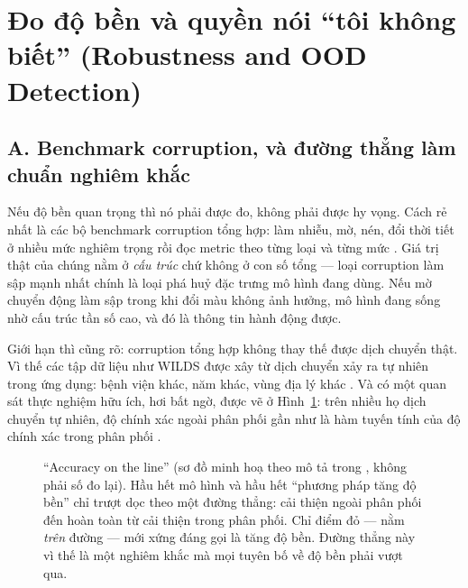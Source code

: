 \documentclass[../../deep_learning.tex]{subfiles}
\begin{document}
\section{Đo độ bền và quyền nói ``tôi không biết'' (Robustness and OOD Detection)}

\subsection{A. Benchmark corruption, và đường thẳng làm chuẩn nghiêm khắc}
Nếu độ bền quan trọng thì nó phải được đo, không phải được hy vọng. Cách rẻ nhất là các bộ benchmark corruption tổng hợp: làm nhiễu, mờ, nén, đổi thời tiết ở nhiều mức nghiêm trọng rồi đọc metric theo từng loại và từng mức \cite{hendrycks2019benchmarking}. Giá trị thật của chúng nằm ở \emph{cấu trúc} chứ không ở con số tổng --- loại corruption làm sập mạnh nhất chính là loại phá huỷ đặc trưng mô hình đang dùng. Nếu mờ chuyển động làm sập trong khi đổi màu không ảnh hưởng, mô hình đang sống nhờ cấu trúc tần số cao, và đó là thông tin hành động được.

Giới hạn thì cũng rõ: corruption tổng hợp không thay thế được dịch chuyển thật. Vì thế các tập dữ liệu như WILDS được xây từ dịch chuyển xảy ra tự nhiên trong ứng dụng: bệnh viện khác, năm khác, vùng địa lý khác \cite{koh2021wilds}. Và có một quan sát thực nghiệm hữu ích, hơi bất ngờ, được vẽ ở Hình~\ref{fig:acc-on-line}: trên nhiều họ dịch chuyển tự nhiên, độ chính xác ngoài phân phối gần như là hàm tuyến tính của độ chính xác trong phân phối \cite{taori2020measuring,recht2019imagenet}.

\begin{figure}[H]\centering
{}
\caption{``Accuracy on the line'' (sơ đồ minh hoạ theo mô tả trong \cite{taori2020measuring}, không phải số đo lại). Hầu hết mô hình và hầu hết ``phương pháp tăng độ bền'' chỉ trượt dọc theo một đường thẳng: cải thiện ngoài phân phối đến hoàn toàn từ cải thiện trong phân phối. Chỉ điểm đỏ --- nằm \emph{trên} đường --- mới xứng đáng gọi là tăng độ bền. Đường thẳng này vì thế là một  nghiêm khắc mà mọi tuyên bố về độ bền phải vượt qua.}
\label{fig:acc-on-line}
\end{figure}
\end{document}
